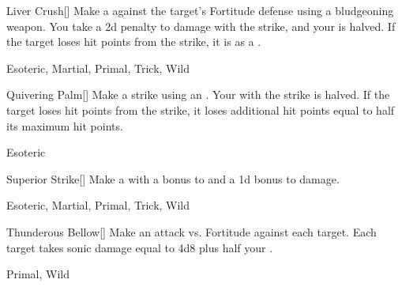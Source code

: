 \lowercase{\hypertarget{maneuver:Liver Crush}{}}\label{maneuver:Liver Crush}
\hypertarget{maneuver:Liver Crush}{}
\begin{freeability}[Rank 7]{Liver Crush}[]
Make a  against the target's Fortitude defense using a bludgeoning weapon.
You take a \minus2d penalty to damage with the strike, and your  is halved.
If the target loses hit points from the strike, it is  as a .


 Esoteric, Martial, Primal, Trick, Wild
\end{freeability}
\vspace{0.25em}



\lowercase{\hypertarget{maneuver:Quivering Palm}{}}\label{maneuver:Quivering Palm}
\hypertarget{maneuver:Quivering Palm}{}
\begin{freeability}[Rank 7]{Quivering Palm}[]
Make a strike using an .
Your  with the strike is halved.
If the target loses hit points from the strike, it loses additional hit points equal to half its maximum hit points.


 Esoteric
\end{freeability}
\vspace{0.25em}



\lowercase{\hypertarget{maneuver:Superior Strike}{}}\label{maneuver:Superior Strike}
\hypertarget{maneuver:Superior Strike}{}
\begin{freeability}[Rank 7]{Superior Strike}[]
Make a  with a  bonus to  and a \plus1d bonus to damage.


 Esoteric, Martial, Primal, Trick, Wild
\end{freeability}
\vspace{0.25em}



\lowercase{\hypertarget{maneuver:Thunderous Bellow}{}}\label{maneuver:Thunderous Bellow}
\hypertarget{maneuver:Thunderous Bellow}{}
\begin{freeability}[Rank 7]{Thunderous Bellow}[]
Make an attack vs. Fortitude against each target.
\hit Each target takes sonic damage equal to 4d8 plus half your .


 Primal, Wild
\end{freeability}
\vspace{0.25em}



